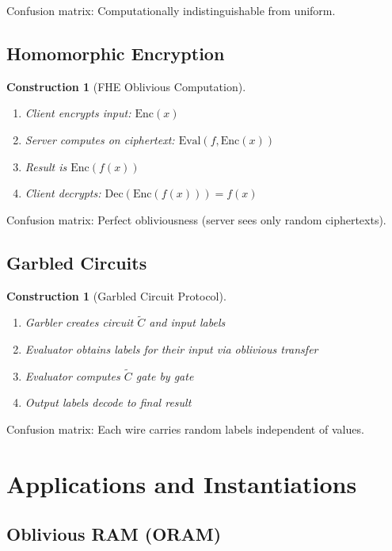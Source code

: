 \documentclass[11pt,final]{article}
\newtheorem{construction}[theorem]{Construction}
\begin{document}
Confusion matrix: Computationally indistinguishable from uniform.

\subsection{Homomorphic Encryption}

\begin{construction}[FHE Oblivious Computation]
\begin{enumerate}
\item Client encrypts input: $\text{Enc}(x)$
\item Server computes on ciphertext: $\text{Eval}(f, \text{Enc}(x))$
\item Result is $\text{Enc}(f(x))$
\item Client decrypts: $\text{Dec}(\text{Enc}(f(x))) = f(x)$
\end{enumerate}
\end{construction}

Confusion matrix: Perfect obliviousness (server sees only random ciphertexts).

\subsection{Garbled Circuits}

\begin{construction}[Garbled Circuit Protocol]
\begin{enumerate}
\item Garbler creates circuit $\tilde{C}$ and input labels
\item Evaluator obtains labels for their input via oblivious transfer
\item Evaluator computes $\tilde{C}$ gate by gate
\item Output labels decode to final result
\end{enumerate}
\end{construction}

Confusion matrix: Each wire carries random labels independent of values.

\section{Applications and Instantiations}

\subsection{Oblivious RAM (ORAM)}
\end{document}
